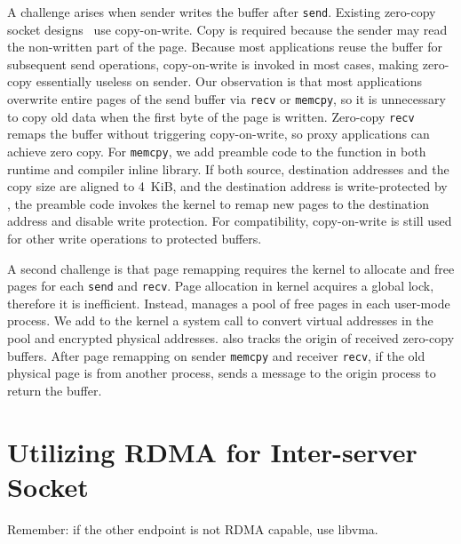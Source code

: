A challenge arises when sender writes the buffer after \texttt{send}.
Existing zero-copy socket designs~\cite{thadani1995efficient,chu1996zero} use copy-on-write. Copy is required because the sender may read the non-written part of the page.
Because most applications reuse the buffer for subsequent send operations, copy-on-write is invoked in most cases, making zero-copy essentially useless on sender.
Our observation is that most applications overwrite entire pages of the send buffer via \texttt{recv} or \texttt{memcpy}, so it is unnecessary to copy old data when the first byte of the page is written.
Zero-copy \texttt{recv} remaps the buffer without triggering copy-on-write, so proxy applications can achieve zero copy.
For \texttt{memcpy}, we add preamble code to the function in both \libipc{} runtime and compiler inline library. If both source, destination addresses and the copy size are aligned to 4~KiB, and the destination address is write-protected by \libipc{}, the preamble code invokes the kernel to remap new pages to the destination address and disable write protection.
For compatibility, copy-on-write is still used for other write operations to protected buffers.

A second challenge is that page remapping requires the kernel to allocate and free pages for each \texttt{send} and \texttt{recv}. Page allocation in kernel acquires a global lock, therefore it is inefficient. Instead, \libipc{} manages a pool of free pages in each user-mode process.
We add to the kernel a system call to convert virtual addresses in the pool and encrypted physical addresses.
\libipc{} also tracks the origin of received zero-copy buffers.
After page remapping on sender \texttt{memcpy} and receiver \texttt{recv}, if the old physical page is from another process, \libipc{} sends a message to the origin process to return the buffer.


\section{Utilizing RDMA for Inter-server Socket}
\label{sec:rdma}

Remember: if the other endpoint is not RDMA capable, use libvma.
